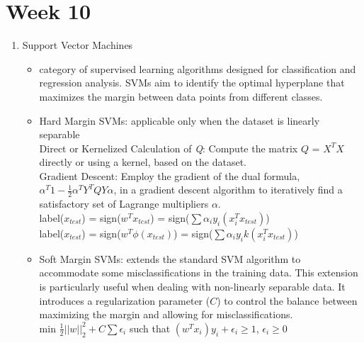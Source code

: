 \documentclass[a4paper]{article}
\begin{document}
\section{Week 10}
\begin{enumerate}
    \item Support Vector Machines
    \begin{itemize}
        \item category of supervised learning algorithms designed for classification and regression analysis. SVMs aim to identify the optimal hyperplane that maximizes the margin between data points from different classes.
        \item Hard Margin SVMs: applicable only when the dataset is linearly separable\\
        Direct or Kernelized Calculation of \textit{Q}: Compute the matrix $Q$ = $X^TX$ directly or using a kernel, based on the dataset.\\
        Gradient Descent: Employ the gradient of the dual formula, $\alpha^T1 - \frac{1}{2}\alpha^TY^TQY\alpha$, in a gradient descent algorithm to iteratively find a satisfactory set of Lagrange multipliers $\alpha$.\\
        label($x_{test}$) = sign($w^Tx_{test}$) = sign($\sum\alpha_iy_i(x_i^Tx_{test})$)\\
        label($x_{test}$) = sign($w^T\phi(x_{test})$) = sign($\sum\alpha_iy_ik(x_i^Tx_{test})$)
        \item Soft Margin SVMs: extends the standard SVM algorithm to accommodate some misclassifications in the training data. This extension is particularly useful when dealing with non-linearly separable data. It introduces a regularization parameter ($C$) to control the balance between maximizing the margin and allowing for misclassifications.\\
        min $\frac{1}{2}||w||^2_2 + C\sum\epsilon_i$ such that $(w^Tx_i)y_i + \epsilon_i \geq 1$, $\epsilon_i \geq 0$
    \end{itemize}
\end{enumerate}
\end{document}
